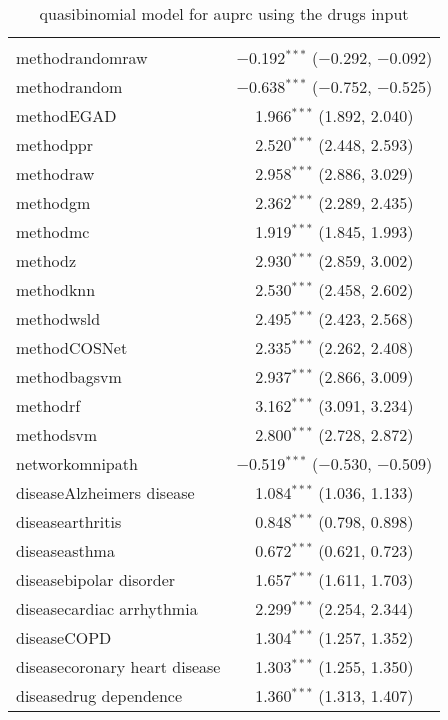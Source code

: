 
\begin{table}[!htbp] \centering 
  \caption{quasibinomial model for auprc using the drugs input} 
  \label{} 
\begin{tabular}{@{\extracolsep{5pt}}lc} 
\\[-1.8ex]\hline 
\hline \\[-1.8ex] 
 methodrandomraw & $-$0.192$^{***}$ ($-$0.292, $-$0.092) \\ 
  methodrandom & $-$0.638$^{***}$ ($-$0.752, $-$0.525) \\ 
  methodEGAD & 1.966$^{***}$ (1.892, 2.040) \\ 
  methodppr & 2.520$^{***}$ (2.448, 2.593) \\ 
  methodraw & 2.958$^{***}$ (2.886, 3.029) \\ 
  methodgm & 2.362$^{***}$ (2.289, 2.435) \\ 
  methodmc & 1.919$^{***}$ (1.845, 1.993) \\ 
  methodz & 2.930$^{***}$ (2.859, 3.002) \\ 
  methodknn & 2.530$^{***}$ (2.458, 2.602) \\ 
  methodwsld & 2.495$^{***}$ (2.423, 2.568) \\ 
  methodCOSNet & 2.335$^{***}$ (2.262, 2.408) \\ 
  methodbagsvm & 2.937$^{***}$ (2.866, 3.009) \\ 
  methodrf & 3.162$^{***}$ (3.091, 3.234) \\ 
  methodsvm & 2.800$^{***}$ (2.728, 2.872) \\ 
  networkomnipath & $-$0.519$^{***}$ ($-$0.530, $-$0.509) \\ 
  diseaseAlzheimers disease & 1.084$^{***}$ (1.036, 1.133) \\ 
  diseasearthritis & 0.848$^{***}$ (0.798, 0.898) \\ 
  diseaseasthma & 0.672$^{***}$ (0.621, 0.723) \\ 
  diseasebipolar disorder & 1.657$^{***}$ (1.611, 1.703) \\ 
  diseasecardiac arrhythmia & 2.299$^{***}$ (2.254, 2.344) \\ 
  diseaseCOPD & 1.304$^{***}$ (1.257, 1.352) \\ 
  diseasecoronary heart disease & 1.303$^{***}$ (1.255, 1.350) \\ 
  diseasedrug dependence & 1.360$^{***}$ (1.313, 1.407) \\ 

\end{tabular}
\end{table}

